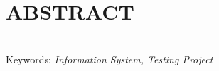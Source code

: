 %

\chapter*{ABSTRACT}

\begin{singlespace}
\blindtext \\[20pt]
Keywords: \textit{Information System, Testing Project}
\end{singlespace}

\newpage